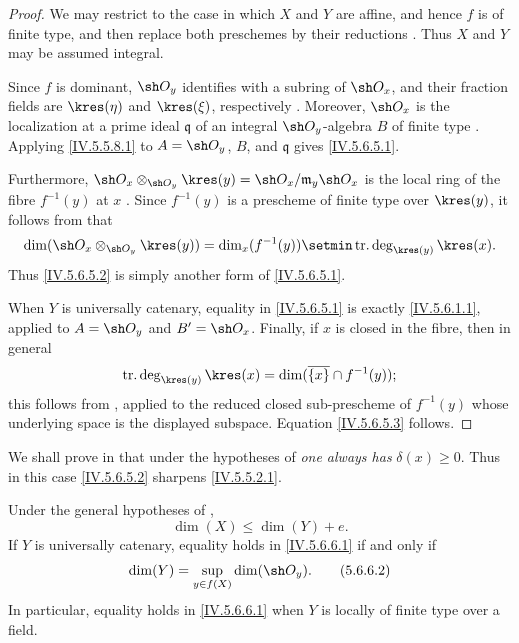 \begin{proof}
We may restrict to the case in which $X$ and $Y$ are affine, and
hence $f$ is of finite type, and then replace both preschemes by
their reductions .  Thus $X$ and $Y$ may be assumed
integral.

Since $f$ is dominant, $\sh O_y$ identifies with a subring of
$\sh O_x$, and their fraction fields are
$\kres(\eta)$ and $\kres(\xi)$, respectively
.  Moreover, $\sh O_x$ is the localization at a
prime ideal $\mathfrak q$ of an integral $\sh O_y$-algebra $B$ of
finite type .  Applying
\eqref{IV.5.5.8.1} to $A=\sh O_y$, $B$, and $\mathfrak q$ gives
\eqref{IV.5.6.5.1}.

Furthermore, $\sh O_x\otimes_{\sh O_y}\kres(y)
=\sh O_x/\mathfrak m_y\sh O_x$
is the local ring of the fibre $f^{-1}(y)$ at $x$
.  Since $f^{-1}(y)$ is a prescheme of finite type over
$\kres(y)$, it follows from  that
\[
\dim(\sh O_x\otimes_{\sh O_y}\kres(y))
 =\dim_x(f^{-1}(y))
  \setmin\operatorname{tr.deg}_{\kres(y)}\kres(x).
\]
Thus \eqref{IV.5.6.5.2} is simply another form of
\eqref{IV.5.6.5.1}.


When $Y$ is universally catenary, equality in
\eqref{IV.5.6.5.1} is exactly \eqref{IV.5.6.1.1}, applied to
$A=\sh O_y$ and $B'=\sh O_x$.  Finally, if $x$ is closed in the
fibre, then in general
\[
\operatorname{tr.deg}_{\kres(y)}\kres(x)
 =\dim(\overline{\{x\}}\cap f^{-1}(y));
\]
this follows from , applied to the reduced closed
sub-prescheme of $f^{-1}(y)$ whose underlying space is the displayed
subspace.  Equation \eqref{IV.5.6.5.3} follows.
\end{proof}

We shall prove in  that under the hypotheses of
 \emph{one always has} $\delta(x)\geq0$.  Thus in this case
\eqref{IV.5.6.5.2} sharpens \eqref{IV.5.5.2.1}.

\begin{corollary}[5.6.6]
\label{IV.5.6.6}
Under the general hypotheses of ,
\begin{equation}
\dim(X)\leq\dim(Y)+e.
\tag{5.6.6.1}\label{IV.5.6.6.1}
\end{equation}
If $Y$ is universally catenary, equality holds in
\eqref{IV.5.6.6.1} if and only if
\begin{equation}
\dim(Y)=\sup_{y\in f(X)}\dim(\sh O_y).
\tag{5.6.6.2}\label{IV.5.6.6.2}
\end{equation}
In particular, equality holds in \eqref{IV.5.6.6.1} when $Y$ is
locally of finite type over a field.
\end{corollary}

